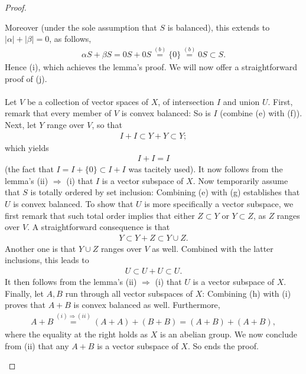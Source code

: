 \begin{proof}
\begin{enumerate}
%
Moreover (under the sole assumption that $S$ is balanced), %
this extends to $|\alpha| + |\beta| = 0$, as follows, %
%
\begin{align} 
  \alpha S + \beta S  = 0S + 0S\overset{(b)}{=} \{0\} 
  \overset{(b)}{=} 0S \subset S.
\end{align}
%
Hence (i), which achieves the lemma's proof. %
We will now offer a straightforward proof of (j). \\
\\
Let $V$ be a collection of vector spaces of $X$, %
of intersection $I$ and union $U$. 
%
First, remark that every member of $V$ is convex balanced: %
So is $I$ (combine (e) with (f)). %
%
Next, let $\mathit{Y}$ range over $V$, so that %
%
\begin{align}
  I + I \subset Y + Y \subset  Y; 
\end{align}
%
which yields
%
\begin{align}
  I + I = I 
\end{align}
%
(the fact that $I  = I + \{0\} \subset I + I$ was tacitely used). %
%
It now follows from the lemma's (ii) $\Rightarrow$ (i) that %
$I$ is a vector subspace of $X$. %
%
Now temporarily assume that $S$ is totally ordered by set inclusion: %
Combining (e) with (g) establishes that $U$ is convex balanced. %
%
To show that $U$ is more specifically a vector subspace, %
we first remark that such total order implies that either %
$Z \subset Y$ or $Y \subset Z$, as $\mathit{Z}$ ranges over $V$. %
A straightforward consequence is that 
%
\begin{align}
  Y \subset Y + Z  \subset Y\cup Z.
\end{align}
%
Another one is that $Y \cup Z$ ranges over $V$ as well. %
Combined with the latter inclusions, this leads to %
%
\begin{align}
  U \subset U  + U \subset U.
\end{align}
%
It then follows from the lemma's (ii) $\Rightarrow$ (i) that %
$U$ is a vector subspace of $X$. %
%
Finally, let $\mathit{A},\mathit{B}$ run through all vector subspaces of $X$: %
Combining (h) with (i) proves that $A+B$ is convex balanced as well. %
%
Furthermore, %
%
\begin{align}
  A + B \overset{(i) \Rightarrow (ii)}{=} (A + A) + (B + B) = (A + B) + (A + B),
\end{align}
% 
where the equality at the right holds as $X$ is an abelian group. %
We now conclude from (ii) that any $A+B$ is a vector subspace of $X$. %
%
So ends the proof. %
\end{enumerate}
\end{proof}
